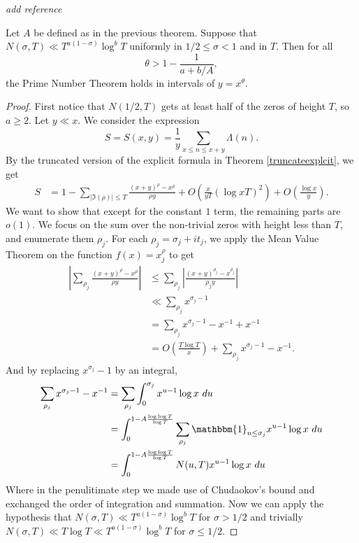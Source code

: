 \textit{add reference}
\begin{theorem}[Hoheisel] \label{Hoheisel}
    Let $A$ be defined as in the previous theorem.
    Suppose that $N(\sigma, T)\ll T^{a(1-\sigma)}\log^b T$ uniformly in $1/2\leq\sigma<1$ and in $T$. Then for all \[
        \theta > 1 - \frac{1}{a+b/A},
    \] the Prime Number Theorem holds in 
    intervals of $y=x^\theta$.
\end{theorem}
\begin{proof}
    First notice that $N(1/2,T)$ gets at least half of the zeros of height $T$, so $a\geq 2$.
    Let $y\ll x$. 
    We consider the expression \[
        S=S(x,y)=\frac{1}{y}\sum_{x\leq n \leq x+y} \Lambda(n).
    \]
    By the truncated version of the explicit formula in Theorem \ref{truncateexplcit}, we get
    \begin{align*}
        S &= 1 - \sum_{|\Im{(\rho)}|\leq T} \frac{(x+y)^\rho-x^\rho}{\rho y} + O(\frac{x}{yT}(\log xT) ^2) + O(\frac{\log x}{y}) . 
    \end{align*} 
    We want to show that except for the constant $1$ term, the remaining parts are $o(1)$.
    We focus on the sum over the non-trivial zeros with height less than $T$, and enumerate them $\rho_j$. For each $\rho_j=\sigma_j+it_j$, we apply the Mean Value Theorem on the function $f(x)=x^\rho_j$ to get
    \begin{align*}
        \left|\sum_{\rho_j} \frac{(x+y)^\rho-x^\rho}{\rho y}\right|&\leq \sum_{\rho_j}\left|\frac{(x+y)^{\rho_j}-x^{\rho_j}}{\rho_j y}\right|\\
        &\ll \sum_{\rho_j} x^{\sigma_j-1}\\
        &= \sum_{\rho_j} x^{\sigma_j-1} - x^{-1} + x^{-1}\\
        &= O\left(\frac{T\log T}{x}\right) + \sum_{\rho_j} x^{\sigma_j-1} - x^{-1}.
    \end{align*}
    And by replacing $x^{\sigma_j}-1$ by an integral,\begin{align*}
        \sum_{\rho_j} x^{\sigma_j-1} - x^{-1} &=\sum_{\rho_j} \int_0^{\sigma_j}  x^{u-1} \log x \ du \\ 
        &=  \int_0^{1-A\frac{\log \log T}{\log T}} \sum_{\rho_j} \mathbbm{1}_{u\leq \sigma_j}x^{u-1} \log x \ du\\
        &= \int_0^{1-A\frac{\log \log T}{\log T}} N(u,T) x^{u-1} \log x \ du
    \end{align*}
    Where in the penulitimate step we made use of Chudaokov's bound and exchanged the order of integration and summation.
    Now we can apply the hypothesis that $N(\sigma, T)\ll T^{a(1-\sigma)}\log^b T$ for $\sigma>1/2$ and trivially $N(\sigma, T)\ll T \log T \ll T^{a(1-\sigma)}\log^b T$ for $\sigma \leq 1/2$.

\end{proof}
